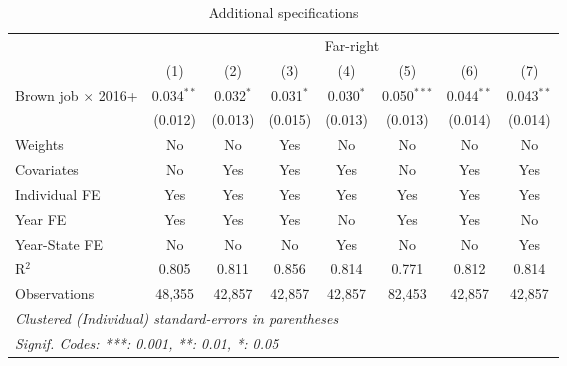 \begin{table}[htbp]
   \caption{Additional specifications}
   \centering
   \begin{tabular}{lccccccc}
      \tabularnewline \midrule \midrule
       & \multicolumn{7}{c}{Far-right}\\
                                & (1)          & (2)         & (3)         & (4)         & (5)           & (6)          & (7)\\  
      Brown job $\times$ 2016+  & 0.034$^{**}$ & 0.032$^{*}$ & 0.031$^{*}$ & 0.030$^{*}$ & 0.050$^{***}$ & 0.044$^{**}$ & 0.043$^{**}$\\   
                                & (0.012)      & (0.013)     & (0.015)     & (0.013)     & (0.013)       & (0.014)      & (0.014)\\   
      Weights                   & No           & No          & Yes         & No          & No            & No           & No\\  
      Covariates                & No           & Yes         & Yes         & Yes         & No            & Yes          & Yes\\  
      Individual FE             & Yes          & Yes         & Yes         & Yes         & Yes           & Yes          & Yes\\  
      Year FE                   & Yes          & Yes         & Yes         & No          & Yes           & Yes          & No\\  
      Year-State FE             & No           & No          & No          & Yes         & No            & No           & Yes\\  
      R$^2$                     & 0.805        & 0.811       & 0.856       & 0.814       & 0.771         & 0.812        & 0.814\\  
      Observations              & 48,355       & 42,857      & 42,857      & 42,857      & 82,453        & 42,857       & 42,857\\  
      \midrule \midrule
      \multicolumn{8}{l}{\emph{Clustered (Individual) standard-errors in parentheses}}\\
      \multicolumn{8}{l}{\emph{Signif. Codes: ***: 0.001, **: 0.01, *: 0.05}}\\
   \end{tabular}
\end{table}


